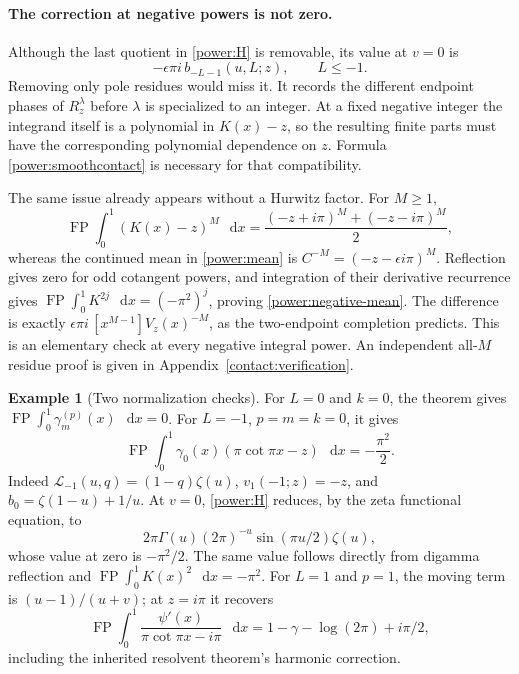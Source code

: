 \documentclass[11pt,a4paper]{article}
\numberwithin{equation}{section}
\theoremstyle{definition}
\newtheorem{example}[theorem]{Example}
\theoremstyle{remark}
\DeclareMathOperator{\FP}{FP}
\newcommand{\dd}{\mathop{}\!\mathrm{d}}
\begin{document}
\paragraph{The correction at negative powers is not zero.}
Although the last quotient in \eqref{power:H} is removable, its
value at $v=0$ is
\begin{equation}\label{power:smoothcontact}
 -\epsilon\pi i\,b_{-L-1}(u,L;z),\qquad L\le-1.
\end{equation}
Removing only pole residues would miss it.  It records the different
endpoint phases of $R_z^\lambda$ before $\lambda$ is specialized to
an integer.  At a fixed negative integer the integrand itself is a
polynomial in $K(x)-z$, so the resulting finite parts must have the
corresponding polynomial dependence on $z$.  Formula
\eqref{power:smoothcontact} is necessary for that compatibility.

The same issue already appears without a Hurwitz factor.  For $M\ge1$,
\begin{equation}\label{power:negative-mean}
 \FP\int_0^1(K(x)-z)^M\,\dd x
 =\frac{(-z+i\pi)^M+(-z-i\pi)^M}{2},
\end{equation}
whereas the continued mean in \eqref{power:mean} is
$C^{-M}=(-z-\epsilon i\pi)^M$.  Reflection gives zero for odd
cotangent powers, and integration of their derivative recurrence gives
$\FP\int_0^1K^{2j}\,\dd x=(-\pi^2)^j$, proving
\eqref{power:negative-mean}.  The difference is exactly
$\epsilon\pi i\,[x^{M-1}]V_z(x)^{-M}$, as the two-endpoint
completion predicts.  This is an elementary check at every negative
integral power.
An independent all-$M$ residue proof is given in
Appendix~\ref{contact:verification}.

\begin{example}[Two normalization checks]\label{power:canaries}
For $L=0$ and $k=0$, the theorem gives
$\FP\int_0^1\gamma_m^{(p)}(x)\,\dd x=0$.
For $L=-1$, $p=m=k=0$, it gives
\begin{equation}\label{power:cotcheck}
 \FP\int_0^1\gamma_0(x)(\pi\cot\pi x-z)\,\dd x
        =-\frac{\pi^2}{2}.
\end{equation}
Indeed $\mathcal L_{-1}(u,q)=(1-q)\zeta(u)$,
$v_1(-1;z)=-z$, and $b_0=\zeta(1-u)+1/u$.
At $v=0$, \eqref{power:H} reduces, by the zeta functional equation, to
\[
 2\pi\Gamma(u)(2\pi)^{-u}\sin(\pi u/2)\zeta(u),
\]
whose value at zero is $-\pi^2/2$.  The same value follows directly
from digamma reflection and $\FP\int_0^1K(x)^2\,\dd x=-\pi^2$.
For $L=1$ and $p=1$, the moving term is $(u-1)/(u+v)$; at
$z=i\pi$ it recovers
\[
 \FP\int_0^1\frac{\psi'(x)}{\pi\cot\pi x-i\pi}\,\dd x
       =1-\gamma-\log(2\pi)+i\pi/2,
\]
including the inherited resolvent theorem's harmonic correction.
\end{example}
\end{document}
